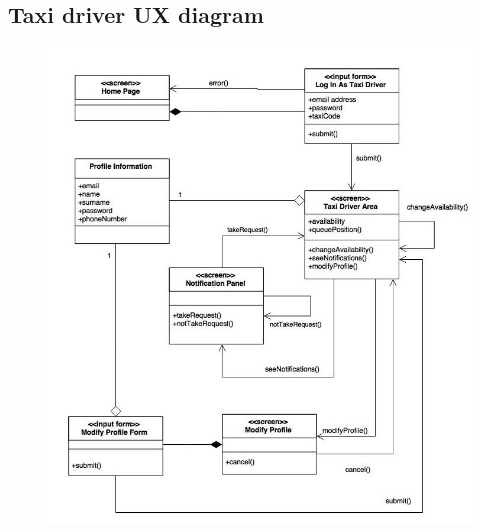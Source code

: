 \documentclass[18pt,oneside,a4paper, titlepage]{article}
\begin{document}
		\subsection{Taxi driver UX diagram}
		\vspace{1cm}
		\begin{figure}[h]
			\centering
			\includegraphics[scale=0.7]{Diagrams/UXDiagramTaxiDriver.jpg}
		\end{figure}
		
		\newpage
\end{document}
